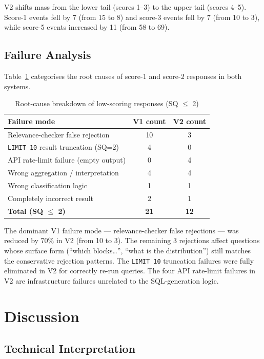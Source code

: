 \documentclass{article}
\begin{document}
V2 shifts mass from the lower tail (scores 1--3) to the upper tail (scores 4--5). Score-1 events fell by 7 (from 15 to 8) and score-3 events fell by 7 (from 10 to 3), while score-5 events increased by 11 (from 58 to 69).

\subsection{Failure Analysis}

Table~\ref{tab:failures} categorises the root causes of score-1 and score-2 responses in both systems.

\begin{table}[h]
\centering
\caption{Root-cause breakdown of low-scoring responses (SQ $\leq$ 2)}
\label{tab:failures}
\begin{tabular}{lcc}
\toprule
\textbf{Failure mode} & \textbf{V1 count} & \textbf{V2 count} \\
\midrule
Relevance-checker false rejection & 10 & 3 \\
\texttt{LIMIT 10} result truncation (SQ=2) & 4 & 0 \\
API rate-limit failure (empty output) & 0 & 4 \\
Wrong aggregation / interpretation & 4 & 4 \\
Wrong classification logic & 1 & 1 \\
Completely incorrect result & 2 & 1 \\
\midrule
\textbf{Total (SQ $\leq$ 2)} & \textbf{21} & \textbf{12} \\
\bottomrule
\end{tabular}
\end{table}

The dominant V1 failure mode --- relevance-checker false rejections --- was reduced by 70\% in V2 (from 10 to 3). The remaining 3 rejections affect questions whose surface form (``which blocks\ldots'', ``what is the distribution'') still matches the conservative rejection patterns. The \texttt{LIMIT 10} truncation failures were fully eliminated in V2 for correctly re-run queries. The four API rate-limit failures in V2 are infrastructure failures unrelated to the SQL-generation logic.

\section{Discussion}

\subsection{Technical Interpretation}
\end{document}
